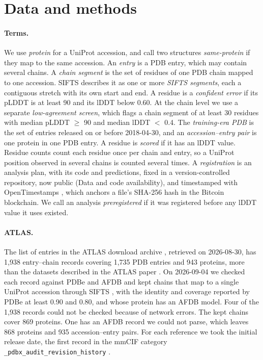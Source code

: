 \documentclass{article}
\begin{document}
\section{Data and methods}
\label{sec:setup}

\paragraph{Terms.} We use \emph{protein} for a UniProt accession, and call
two structures \emph{same-protein} if they map to the same accession. An
\emph{entry} is a PDB entry, which may contain several chains. A \emph{chain
segment} is the set of residues of one PDB chain mapped to one accession.
SIFTS describes it as one or more \emph{SIFTS segments}, each a contiguous
stretch with its own start and end. A residue is a \emph{confident error} if
its pLDDT is at least 90 and its lDDT below 0.60. At the chain level we use a
separate \emph{low-agreement screen}, which flags a chain segment of at least
30 residues with median pLDDT $\ge$ 90 and median lDDT $<$ 0.4. The
\emph{training-era PDB} is the set of entries released on or before
2018-04-30, and an \emph{accession--entry pair} is one protein in one PDB
entry. A residue is \emph{scored} if it has an lDDT value. Residue counts count each residue once per chain and entry, so a UniProt position observed in several chains is counted several times. A
\emph{registration} is an analysis plan, with its code and predictions,
fixed in a version-controlled repository, now public (Data and code availability), and timestamped
with OpenTimestamps
\citep{opentimestamps}, which anchors a file's SHA-256 hash in the Bitcoin
blockchain. We call an analysis \emph{preregistered} if it was registered
before any lDDT value it uses existed.

\paragraph{ATLAS.} The list of entries in the ATLAS download archive
\citep{atlasweb}, retrieved on 2026-08-30, has 1{,}938 entry--chain records
covering 1{,}735 PDB entries and 943 proteins, more than the datasets
described in the ATLAS paper \citep{vandermeersche2024}. On 2026-09-04 we
checked each record against PDBe and AFDB and kept chains that map to a
single UniProt accession through SIFTS \citep{velankar2013,dana2019}, with
the identity and coverage reported by PDBe at least 0.90 and 0.80, and whose
protein has an AFDB model. Four of the 1{,}938 records could not be checked because of network errors. The kept chains cover 869 proteins. One has an AFDB record
we could not parse, which leaves 868 proteins and 935 accession--entry
pairs. For each reference we took the initial release date,
the first record in the mmCIF category
\texttt{\_pdbx\_audit\_revision\_history} \citep{mmcifdict}.
\end{document}
